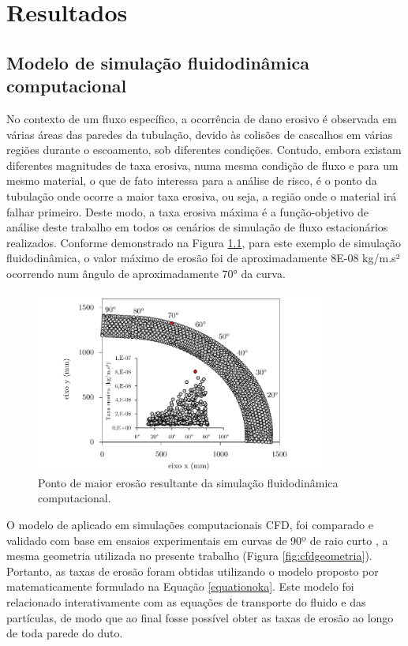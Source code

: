 \chapter{Resultados}

\section{Modelo de simulação fluidodinâmica computacional}


No contexto de um fluxo específico, a ocorrência de dano erosivo é observada em várias áreas das paredes da tubulação, devido às colisões de cascalhos em várias regiões durante o escoamento, sob diferentes condições. Contudo, embora existam diferentes magnitudes de taxa erosiva, numa mesma condição de fluxo e para um mesmo material, o que de fato interessa para a análise de risco, é o ponto da tubulação onde ocorre a maior taxa erosiva, ou seja, a região onde o material irá falhar primeiro. Deste modo, a taxa erosiva máxima é a função-objetivo de análise deste trabalho em todos os cenários de simulação de fluxo estacionários realizados. Conforme demonstrado na Figura \ref{fig:maiorerosao}, para este exemplo de simulação fluidodinâmica, o valor máximo de erosão foi de aproximadamente 8E-08 kg/m.s² ocorrendo num ângulo de aproximadamente 70° da curva. 

\begin{figure}[H] 
    \centering  
    \includegraphics[width=0.85\textwidth]{Figuras/pontodemaiiorerosao.pdf}  
    \caption{Ponto de maior erosão resultante da simulação fluidodinâmica computacional.}  
    \label{fig:maiorerosao}  
\end{figure}

O modelo de  aplicado em simulações computacionais CFD, foi comparado e validado com base em ensaios experimentais em curvas de 90º de raio curto \cite{liuuh}, a mesma geometria utilizada no presente trabalho (Figura \ref{fig:cfdgeometria}). Portanto, as taxas de erosão foram obtidas utilizando o modelo proposto por  matematicamente formulado na Equação \ref{equationoka}. Este modelo foi relacionado interativamente com as equações de transporte do fluido e das partículas, de modo que ao final fosse possível obter as taxas de erosão ao longo de toda parede do duto.

